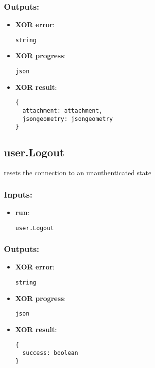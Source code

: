\subsubsection*{Outputs:}
\begin{itemize}
    \item \textbf{XOR error}: 
\begin{lstlisting}
string
\end{lstlisting}
    \item \textbf{XOR progress}: 
\begin{lstlisting}
json
\end{lstlisting}
    \item \textbf{XOR result}: 
\begin{lstlisting}
{
  attachment: attachment, 
  jsongeometry: jsongeometry
}
\end{lstlisting}
  \end{itemize}

\subsection{user.Logout}
\label{ch:builtinservices:user.Logout}
resets the connection to an unauthenticated state
\subsubsection*{Inputs:}
\begin{itemize}
    \item \textbf{run}: 
\begin{lstlisting}
user.Logout
\end{lstlisting}
  \end{itemize}

\subsubsection*{Outputs:}
\begin{itemize}
    \item \textbf{XOR error}: 
\begin{lstlisting}
string
\end{lstlisting}
    \item \textbf{XOR progress}: 
\begin{lstlisting}
json
\end{lstlisting}
    \item \textbf{XOR result}: 
\begin{lstlisting}
{
  success: boolean
}
\end{lstlisting}
  \end{itemize}

